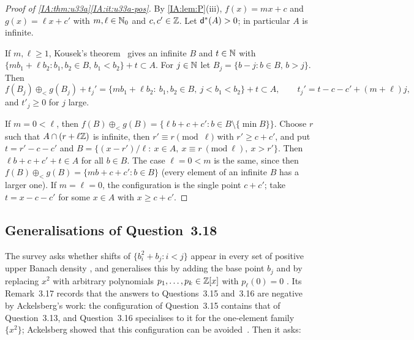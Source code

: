\begin{proof}[Proof of \cref{IA:thm:u33a}\ref{IA:it:u33a-pos}]
By \cref{IA:lem:P}(iii), $f(x)=mx+c$ and $g(x)=\ell x+c'$ with $m,\ell\in\mathbb{N}_0$ and $c,c'\in\mathbb{Z}$. Let
$\mathsf{d}^*(A)>0$; in particular $A$ is infinite.

If $m,\ell\ge1$, Kousek's theorem~\cite[Theorem~1.2]{kousek2025asymmetric} gives an infinite $B$ and
$t\in\mathbb{N}$ with $\{mb_1+\ell b_2:b_1,b_2\in B,\,b_1<b_2\}+t\subset A$. For $j\in\mathbb{N}$ let
$B_j=\{b-j:b\in B,\,b>j\}$. Then
\[
f(B_j)\oplus_<g(B_j)+t_j'=\{mb_1+\ell b_2:\ b_1,b_2\in B,\ j<b_1<b_2\}+t\subset A,
\qquad t_j'=t-c-c'+(m+\ell)j,
\]
and $t'_j\ge0$ for $j$ large.

If $m=0<\ell$, then $f(B)\oplus_<g(B)=\{\ell b+c+c':b\in B\setminus\{\min B\}\}$. Choose $r$ such
that $A\cap(r+\ell\mathbb{Z})$ is infinite, then $r'\equiv r\pmod\ell$ with $r'\ge c+c'$, and put $t=r'-c-c'$
and $B=\{(x-r')/\ell:\ x\in A,\ x\equiv r\ (\mathrm{mod}\ \ell),\ x>r'\}$. Then $\ell b+c+c'+t\in A$ for
all $b\in B$. The case $\ell=0<m$ is the same, since then
$f(B)\oplus_<g(B)=\{mb+c+c':b\in B\}$ (every element of an infinite $B$ has a larger one). If
$m=\ell=0$, the configuration is the single point $c+c'$; take $t=x-c-c'$ for some $x\in A$ with
$x\ge c+c'$.
\end{proof}


\subsection{Generalisations of Question~3.18}\label{IA:sec:u33e}
The survey asks whether shifts of
$\{b_i^2+b_j:i<j\}$ appear in every set of positive upper Banach density
\cite[Question~3.13]{kra2023problems}, and generalises this by adding the base point $b_j$
\cite[Question~3.15]{kra2023problems} and by replacing $x^2$ with arbitrary polynomials
$p_1,\dots,p_k\in\mathbb{Z}[x]$ with $p_\ell(0)=0$ \cite[Question~3.16]{kra2023problems}. Its
Remark~3.17 records that the answers to Questions~3.15 and~3.16 are negative by Ackelsberg's work:
the configuration of Question~3.15 contains that of Question~3.13, and Question~3.16 specialises to
it for the one-element family $\{x^2\}$; Ackelsberg showed that this configuration can be
avoided~\cite[Theorem~1.5]{ackelsberg2024counterexamples}. Then it asks:

